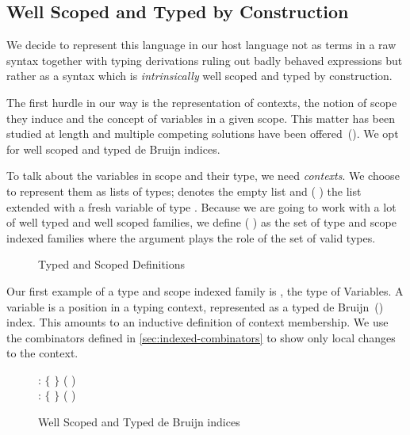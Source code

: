 \begin{convention}
\end{convention}

\subsection{Well Scoped and Typed by Construction}

We decide to represent this language in our host language not as terms in
a raw syntax together with typing derivations ruling out badly behaved
expressions but rather as a syntax which is \emph{intrinsically} well scoped
and typed by construction.

The first hurdle in our way is the representation of contexts, the notion
of scope they induce and the concept of variables in a given scope. This
matter has been studied at length and multiple competing solutions have been
offered~(\cite{DBLP:conf/tphol/AydemirBFFPSVWWZ05}). We opt for well scoped
and typed de Bruijn indices.

To talk about the variables in scope and their type, we need \emph{contexts}. We
choose to represent them as lists of types; \AIC{[]} denotes the empty list and
(  ) the list  extended with a fresh variable of type .
Because we are going to work with a lot of well typed and well scoped families,
we define ( ) as the set of type and scope indexed families
where the argument  plays the role of the set of valid types.

\begin{figure}[h]
\caption{Typed and Scoped Definitions\label{fig:scoped}}
\end{figure}

Our first example of a type and scope indexed family is , the type of Variables.
A variable is a position in a typing context, represented as a typed
de Bruijn~(\citeyear{de1972lambda}) index. This amounts to an inductive definition of
context membership. We use the combinators defined in \cref{sec:indexed-combinators}
to show only local changes to the context.

\begin{figure}[h]
\begin{minipage}{0.5\textwidth}
\end{minipage}
\begin{minipage}{0.5\textwidth}
  \vspace*{\baselineskip}
   : { $\lbrace$ $\rbrace$ 
              ( \AIC{::} )}
  \\
   : { $\lbrace$  $\rbrace$ 
                  ( \AIC{::} )}
\end{minipage}
\caption{Well Scoped and Typed de Bruijn indices\label{fig:variable}}
\end{figure}

